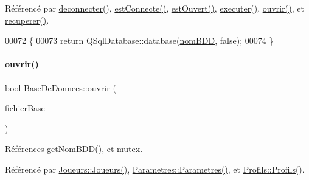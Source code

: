 Référencé par \hyperlink{class_base_de_donnees_ae780999d25a26a0e4dbe0706a4785978}{deconnecter()}, \hyperlink{class_base_de_donnees_a00388973f3ec42e5c8e76e7af7e124b2}{est\+Connecte()}, \hyperlink{class_base_de_donnees_af9ac332082ffd0dd35e412cefabe5e9c}{est\+Ouvert()}, \hyperlink{class_base_de_donnees_aa8de5f8f8bb17edc43f5c0ee33712081}{executer()}, \hyperlink{class_base_de_donnees_a7f6a5510b08017b0d99115a84252f186}{ouvrir()}, et \hyperlink{class_base_de_donnees_a77539baad389f5acf754cd2cd452403e}{recuperer()}.


\begin{DoxyCode}
00072 \{
00073     \textcolor{keywordflow}{return} QSqlDatabase::database(\hyperlink{class_base_de_donnees_a67c1d973c267a8f5fd6d7461550faa11}{nomBDD}, \textcolor{keyword}{false});
00074 \}
\end{DoxyCode}
\mbox{\label{class_base_de_donnees_a7f6a5510b08017b0d99115a84252f186}} 
\paragraph{\texorpdfstring{ouvrir()}{ouvrir()}}
{\footnotesize\ttfamily bool Base\+De\+Donnees\+::ouvrir (\begin{DoxyParamCaption}\item[{Q\+String}]{fichier\+Base }\end{DoxyParamCaption})}



Références \hyperlink{class_base_de_donnees_a467909531ae3cdebaf173f6e97cdc624}{get\+Nom\+B\+D\+D()}, et \hyperlink{class_base_de_donnees_aa1b4696fac87a740f914aa73739086f2}{mutex}.



Référencé par \hyperlink{class_joueurs_ac0f9bfbacdcda2622d7438d0445200e8}{Joueurs\+::\+Joueurs()}, \hyperlink{class_parametres_a5197a69e0f07e253e6119b4af95344f4}{Parametres\+::\+Parametres()}, et \hyperlink{class_profils_abe936fbdac7c189d93aca3fcd8f6c7e6}{Profils\+::\+Profils()}.



